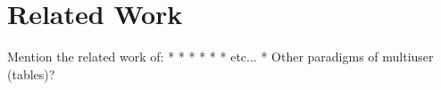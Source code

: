 \section{Related Work}

Mention the related work of:
* \cite{bolt_put-that-there:_1980}
* \cite{brooks_intelligent_1997}
* \cite{carbini_wizard_2006}
* \cite{farrell_symbiotic_2016}
* \cite{arai_cira:_2019}
* etc...
    * Other paradigms of multiuser (tables)?
